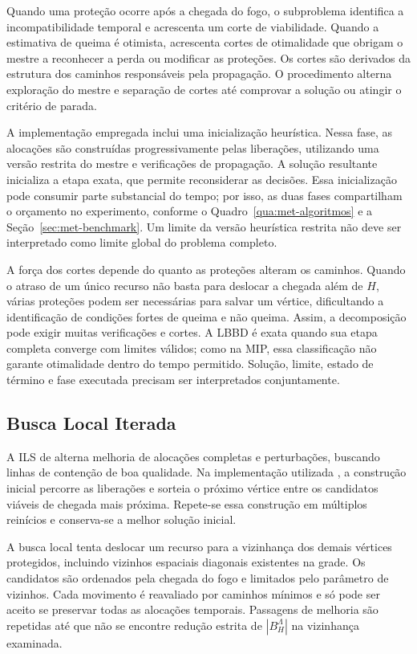 Quando uma proteção ocorre após a chegada do fogo, o subproblema identifica
a incompatibilidade temporal e acrescenta um corte de viabilidade.
Quando a estimativa de queima é otimista, acrescenta cortes de otimalidade
que obrigam o mestre a reconhecer a perda ou modificar as proteções.
Os cortes são derivados da estrutura dos caminhos responsáveis pela
propagação. O procedimento alterna exploração do mestre e separação de
cortes até comprovar a solução ou atingir o critério de parada.

A implementação empregada inclui uma inicialização heurística. Nessa
fase, as alocações são construídas progressivamente pelas liberações,
utilizando uma versão restrita do mestre e verificações de propagação.
A solução resultante inicializa a etapa exata, que permite reconsiderar
as decisões. Essa inicialização pode consumir parte substancial do tempo;
por isso, as duas fases compartilham o orçamento no experimento, conforme
o Quadro~\ref{qua:met-algoritmos} e a Seção~\ref{sec:met-benchmark}.
Um limite da versão heurística restrita não deve ser interpretado como
limite global do problema completo.

A força dos cortes depende do quanto as proteções alteram os caminhos.
Quando o atraso de um único recurso não basta para deslocar a chegada além
de $H$, várias proteções podem ser necessárias para salvar um vértice,
dificultando a identificação de condições fortes de queima e não queima.
Assim, a decomposição pode exigir muitas verificações e cortes.
A LBBD é exata quando sua etapa completa converge com limites válidos;
como na MIP, essa classificação não garante otimalidade dentro do tempo
permitido. Solução, limite, estado de término e fase executada precisam
ser interpretados conjuntamente.

\subsection{Busca Local Iterada}\label{sec:ils}

A ILS de  alterna melhoria de alocações
completas e perturbações, buscando linhas de contenção de boa qualidade.
Na implementação utilizada \cite{HarrisForbesTaimre2023}, a construção
inicial percorre as liberações e sorteia o próximo vértice entre os
candidatos viáveis de chegada mais próxima. Repete-se essa construção em
múltiplos reinícios e conserva-se a melhor solução inicial.

A busca local tenta deslocar um recurso para a vizinhança dos demais
vértices protegidos, incluindo vizinhos espaciais diagonais existentes
na grade. Os candidatos são ordenados pela chegada do fogo e limitados
pelo parâmetro de vizinhos. Cada movimento é reavaliado por caminhos
mínimos e só pode ser aceito se preservar todas as alocações temporais.
Passagens de melhoria são repetidas até que não se encontre redução
estrita de $|B_H^{\Lambda}|$ na vizinhança examinada.

